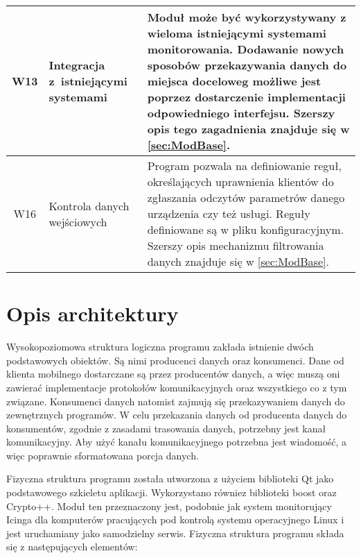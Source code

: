 \begin{longtable}[c]{|c||p{3.5cm}|p{9cm}|}
  W13 & \raggedright{Integracja z~istniejącymi systemami} & \raggedright{Moduł może być wykorzystywany z wieloma istniejącymi systemami monitorowania. Dodawanie nowych sposobów przekazywania danych do miejsca doceloweg możliwe jest poprzez dostarczenie implementacji odpowiedniego interfejsu. Szerszy opis tego zagadnienia znajduje się w \ref{sec:ModBase}.} \tabularnewline
  \hline

  W16 & \raggedright{Kontrola danych wejściowych} & \raggedright{Program pozwala na definiowanie reguł, określających uprawnienia klientów do zgłaszania odczytów parametrów danego urządzenia czy też usługi. Reguły definiowane są w pliku konfiguracyjnym. Szerszy opis mechanizmu filtrowania danych znajduje się w \ref{sec:ModBase}.} \tabularnewline
  \hline

\end{longtable}


\section[Opis architektury][Opis architektury]{Opis architektury}

Wysokopoziomowa struktura logiczna programu zakłada istnienie dwóch
podstawowych obiektów. Są nimi producenci danych oraz konsumenci. Dane
od klienta mobilnego dostarczane są przez producentów danych, a więc
muszą oni zawierać implementacje protokołów komunikacyjnych oraz
wszystkiego co z tym związane. Konsumenci danych natomist zajmują się
przekazywaniem danych do zewnętrznych programów. W celu przekazania
danych od producenta danych do konsumentów, zgodnie z zasadami
trasowania danych, potrzebny jest kanał komunikacyjny. Aby użyć kanału
komunikacyjnego potrzebna jest wiadomość, a więc poprawnie
sformatowana porcja danych.


Fizyczna struktura programu została utworzona z użyciem biblioteki Qt
jako podstawowego szkieletu aplikacji. Wykorzystano równiez biblioteki
boost oraz Crypto++. Moduł ten przeznaczony jest, podobnie jak system
monitorujący Icinga dla komputerów pracujących pod kontrolą systemu
operacyjnego Linux i jest uruchamiany jako samodzielny serwis. Fizyczna struktura programu składa się z następujących elementów:

